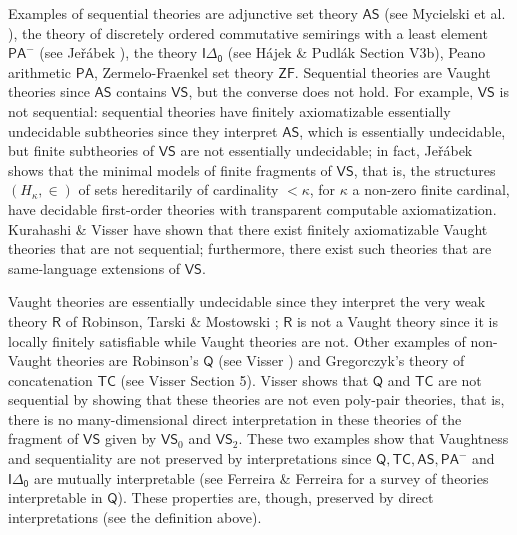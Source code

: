 \documentclass[10pt,a4paper, openany,  oldfontcommands]{memoir}
\newtheorem{open problem} [theorem] {Open Problem}
\newtheorem{open question} [theorem] {Open Question}
\begin{document}
Examples of    sequential theories are   adjunctive set theory $ \mathsf{AS} $ (see  Mycielski  et al.  \cite[Appendix III]{AMSVolume426Year1990}),  
the theory of discretely ordered commutative semirings with a least element $ \mathsf{PA^-} $  (see Jeřábek  \cite{Jerabek2012}), 
the theory   $ \mathsf{I \Delta_0 } $ (see Hájek \&  Pudlák  \cite{HajekandPudlak2017}  Section V3b), 
Peano arithmetic $ \mathsf{PA} $, 
Zermelo-Fraenkel set theory $ \mathsf{ZF} $.
Sequential theories are Vaught theories  since $   \mathsf{AS} $ contains $  \mathsf{VS} $,  but the converse does not hold. 
For example,   $  \mathsf{VS} $   is not sequential: 
sequential theories  have finitely axiomatizable  essentially  undecidable subtheories since  they  interpret   $  \mathsf{AS} $, 
which is  essentially undecidable, 
 but   finite subtheories  of  $ \mathsf{VS} $ are  not essentially undecidable; 
in fact, Jeřábek  \cite{Jerabek2022} shows that the minimal models of finite fragments of $ \mathsf{VS} $, 
that  is,  the structures $  \left(   H_{  \kappa  }     ,    \in  \right)   $  of sets   hereditarily of cardinality $  <  \kappa  $,    for $  \kappa $ a non-zero finite cardinal, 
have decidable first-order theories with  transparent computable axiomatization. 
Kurahashi \& Visser   \cite{KurahashiVisser}  have      shown that there   exist  finitely axiomatizable   Vaught theories  that are   not sequential; 
furthermore,  there exist such theories  that are  same-language extensions of    $  \mathsf{VS} $. 







Vaught  theories are  essentially undecidable  since they interpret the very weak theory   $  \mathsf{R} $  of  
Robinson, Tarski \& Mostowski   \cite{tarski1953}; 
  $  \mathsf{R} $   is not a Vaught theory since it is locally finitely satisfiable while Vaught theories are not. 
Other examples of non-Vaught theories are 
Robinson's  $ \mathsf{Q} $  (see    Visser \cite{Visser2017}) 
and   Gregorczyk's    theory of concatenation $ \mathsf{TC} $ (see   Visser   \cite{Visser2009NDJFL}  Section 5). 
Visser shows  that $ \mathsf{Q} $  and  $ \mathsf{TC} $ are not sequential by showing that these theories are not even poly-pair theories, 
that is, there is no many-dimensional direct interpretation in these theories 
of the fragment of  $  \mathsf{VS} $  given by  $  \mathsf{VS}_0  $  and  $  \mathsf{VS}_2  $. 
These two examples show that Vaughtness and sequentiality  are  not preserved by interpretations since 
$  \mathsf{Q} ,  \mathsf{TC},  \mathsf{AS},  \mathsf{PA}^- $  and  $ \mathsf{I \Delta_0 } $ are  mutually interpretable 
(see  Ferreira \& Ferreira \cite{Ferreira2013} for a survey of  theories  interpretable in $  \mathsf{Q} $).
These properties are,  though,  preserved by   direct interpretations
(see the definition above). 
\end{document}
